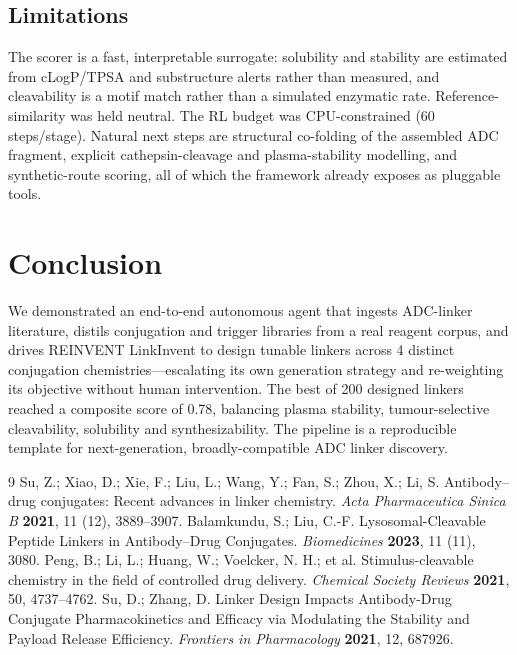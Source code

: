 \documentclass[10pt]{article}
\begin{document}
\subsection{Limitations}
The scorer is a fast, interpretable surrogate: solubility and stability are estimated from cLogP/TPSA and substructure alerts rather than measured, and cleavability is a motif match rather than a simulated enzymatic rate. Reference-similarity was held neutral. The RL budget was CPU-constrained (60 steps/stage). Natural next steps are structural co-folding of the assembled ADC fragment, explicit cathepsin-cleavage and plasma-stability modelling, and synthetic-route scoring, all of which the framework already exposes as pluggable tools.
\section{Conclusion}
We demonstrated an end-to-end autonomous agent that ingests ADC-linker literature, distils conjugation and trigger libraries from a real reagent corpus, and drives REINVENT LinkInvent to design tunable linkers across 4 distinct conjugation chemistries---escalating its own generation strategy and re-weighting its objective without human intervention. The best of 200 designed linkers reached a composite score of 0.78, balancing plasma stability, tumour-selective cleavability, solubility and synthesizability. The pipeline is a reproducible template for next-generation, broadly-compatible ADC linker discovery.
\begin{thebibliography}{9}
 Su, Z.; Xiao, D.; Xie, F.; Liu, L.; Wang, Y.; Fan, S.; Zhou, X.; Li, S. Antibody--drug conjugates: Recent advances in linker chemistry. \emph{Acta Pharmaceutica Sinica B} \textbf{2021}, 11 (12), 3889--3907.
 Balamkundu, S.; Liu, C.-F. Lysosomal-Cleavable Peptide Linkers in Antibody--Drug Conjugates. \emph{Biomedicines} \textbf{2023}, 11 (11), 3080.
 Peng, B.; Li, L.; Huang, W.; Voelcker, N. H.; et al. Stimulus-cleavable chemistry in the field of controlled drug delivery. \emph{Chemical Society Reviews} \textbf{2021}, 50, 4737--4762.
 Su, D.; Zhang, D. Linker Design Impacts Antibody-Drug Conjugate Pharmacokinetics and Efficacy via Modulating the Stability and Payload Release Efficiency. \emph{Frontiers in Pharmacology} \textbf{2021}, 12, 687926.
\end{thebibliography}
\end{document}

